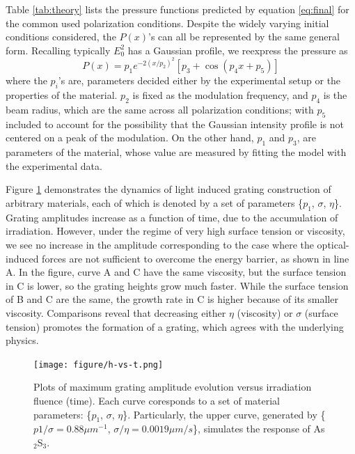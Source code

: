 \documentclass[aps, prl, twocolumn, groupedaddress]{revtex4-1}
\begin{document}
Table \ref{tab:theory} lists the pressure functions predicted by
equation \ref{eq:final} for the common used polarization
conditions. Despite the widely varying initial conditions considered,
the $P(x)$'s can all be represented by the same general
form. Recalling typically $E_0^2$ has a Gaussian profile, we reexpress
the pressure as
\begin{equation}
  P(x) = p_1 e^{-2\left(x/p_2\right)^2}\left[p_3+\cos\left( p_4 x +p_5\right)\right]
  \label{eq:presmod}
\end{equation}
where the $p_i$'s are, parameters decided either by the experimental
setup or the properties of the material. $p_2$ is fixed as the
modulation frequency, and $p_4$ is the beam radius, which are the same
across all polarization conditions; with $p_5$ included to account for
the possibility that the Gaussian intensity profile is not centered on
a peak of the modulation.  On the other hand, $p_1$ and $p_3$, are
parameters of the material, whose value are measured by fitting the
model with the experimental data.

Figure \ref{fig:h-vs-t} demonstrates the dynamics of light induced
grating construction of arbitrary materials, each of which is denoted
by a set of parameters \{$p_1$, $\sigma$, $\eta$\}. Grating amplitudes
increase as a function of time, due to the accumulation of
irradiation. However, under the regime of very high surface tension or
viscosity, we see no increase in the amplitude corresponding to the
case where the optical-induced forces are not sufficient to overcome
the energy barrier, as shown in line A. In the figure, curve A and C
have the same viscosity, but the surface tension in C is lower, so the
grating heights grow much faster. While the surface tension of B and C
are the same, the growth rate in C is higher because of its smaller
viscosity. Comparisons reveal that decreasing either $\eta$
(viscosity) or $\sigma$ (surface tension) promotes the formation of a
grating, which agrees with the underlying physics.

\begin{figure}[!htbp]
  \texttt{[image: figure/h-vs-t.png]}
  \caption{Plots of maximum grating amplitude evolution versus
    irradiation fluence (time). Each curve coresponds to a set of
    material parameters: \{$p_1$, $\sigma$, $\eta$\}. Particularly, the
    upper curve, generated by \{$p1/\sigma = 0.88 \mu m ^{-1}$, $\sigma/\eta =
    0.0019 \mu m / s$\}, simulates the response of As$_2$S$_3$. }
  \label{fig:h-vs-t}
\end{figure}
\end{document}
